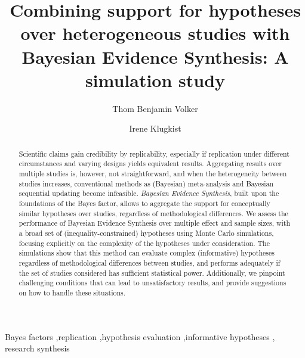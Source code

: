 \documentclass[review, 3p, authoryear]{elsarticle} %
\begin{document}
\begin{frontmatter}

  \title{Combining support for hypotheses over heterogeneous studies with Bayesian Evidence Synthesis: A simulation study}
    \author[Utrecht University]{Thom Benjamin Volker%
  }
    \author[Utrecht University]{Irene Klugkist}
  
  \begin{abstract}
  Scientific claims gain credibility by replicability, especially if replication under different circumstances and varying designs yields equivalent results. Aggregating results over multiple studies is, however, not straightforward, and when the heterogeneity between studies increases, conventional methods as (Bayesian) meta-analysis and Bayesian sequential updating become infeasible. \emph{Bayesian Evidence Synthesis}, built upon the foundations of the Bayes factor, allows to aggregate the support for conceptually similar hypotheses over studies, regardless of methodological differences. We assess the performance of Bayesian Evidence Synthesis over multiple effect and sample sizes, with a broad set of (inequality-constrained) hypotheses using Monte Carlo simulations, focusing explicitly on the complexity of the hypotheses under consideration. The simulations show that this method can evaluate complex (informative) hypotheses regardless of methodological differences between studies, and performs adequately if the set of studies considered has sufficient statistical power. Additionally, we pinpoint challenging conditions that can lead to unsatisfactory results, and provide suggestions on how to handle these situations.
  \end{abstract}
    \begin{keyword}
    Bayes factors \sep replication \sep hypothesis evaluation \sep informative hypotheses \sep 
    research synthesis
  \end{keyword}
  
 \end{frontmatter}

\end{document}
